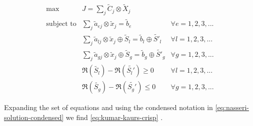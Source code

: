 \documentclass[11pt,a4paper,final]{article}
\begin{document}
\begin{equation}
\label{eq:kumar-kaurs-fuzzy}
\begin{array}{lll}
\text{max}   & J = \sum_j \tilde{C}_j \otimes \tilde{X}_j              &                                              \\
\text{subject to} & \sum_j \tilde{a}_{ej} \otimes \tilde{x}_j               = \tilde{b}_e & \forall e = 1,2,3,...                \\
                  & \sum_j \tilde{a}_{lj} \otimes \tilde{x}_j \oplus \tilde{S}_l = \tilde{b}_l \oplus \tilde{S'}_l & \forall l = 1,2,3,... \\
                  & \sum_j \tilde{a}_{gj} \otimes \tilde{x}_j \oplus \tilde{S}_g = \tilde{b}_g \oplus \tilde{S'}_g & \forall g = 1,2,3,... \\
                  & \mathfrak{R}(\tilde{S_l}) - \mathfrak{R}(\tilde{S_l'}) \ge 0                                     & \forall l = 1,2,3,...      \\
                  & \mathfrak{R}(\tilde{S_g}) - \mathfrak{R}(\tilde{S_g'}) \le 0                                     & \forall g = 1,2,3,...
\end{array}
\end{equation}

Expanding the set of equations and using the condensed notation in \ref{eq:nasseri-solution-condensed} we find
\ref{eq:kumar-kaurs-crisp} \cite{kaur-2016-introd-fuzzy}.
\end{document}
